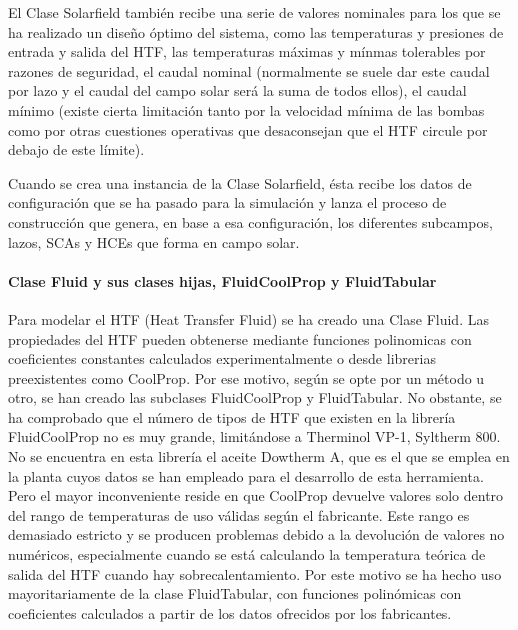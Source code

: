 \documentclass[11pt]{article}
\begin{document}
El Clase Solarfield también recibe una serie de valores nominales para
los que se ha realizado un diseño óptimo del sistema, como las
temperaturas y presiones de entrada y salida del HTF, las temperaturas
máximas y mínmas tolerables por razones de seguridad, el caudal nominal
(normalmente se suele dar este caudal por lazo y el caudal del campo
solar será la suma de todos ellos), el caudal mínimo (existe cierta
limitación tanto por la velocidad mínima de las bombas como por otras
cuestiones operativas que desaconsejan que el HTF circule por debajo de
este límite).

Cuando se crea una instancia de la Clase Solarfield, ésta recibe los
datos de configuración que se ha pasado para la simulación y lanza el
proceso de construcción que genera, en base a esa configuración, los
diferentes subcampos, lazos, SCAs y HCEs que forma en campo solar.

\hypertarget{clase-fluid-y-sus-clases-hijas-fluidcoolprop-y-fluidtabular}{%
\paragraph{Clase Fluid y sus clases hijas, FluidCoolProp y
FluidTabular}\label{clase-fluid-y-sus-clases-hijas-fluidcoolprop-y-fluidtabular}}

Para modelar el HTF (Heat Transfer Fluid) se ha creado una Clase Fluid.
Las propiedades del HTF pueden obtenerse mediante funciones polinomicas
con coeficientes constantes calculados experimentalmente o desde
librerias preexistentes como CoolProp. Por ese motivo, según se opte por
un método u otro, se han creado las subclases FluidCoolProp y
FluidTabular. No obstante, se ha comprobado que el número de tipos de
HTF que existen en la librería FluidCoolProp no es muy grande,
limitándose a Therminol VP-1, Syltherm 800. No se encuentra en esta
librería el aceite Dowtherm A, que es el que se emplea en la planta
cuyos datos se han empleado para el desarrollo de esta herramienta. Pero
el mayor inconveniente reside en que CoolProp devuelve valores solo
dentro del rango de temperaturas de uso válidas según el fabricante.
Este rango es demasiado estricto y se producen problemas debido a la
devolución de valores no numéricos, especialmente cuando se está
calculando la temperatura teórica de salida del HTF cuando hay
sobrecalentamiento. Por este motivo se ha hecho uso mayoritariamente de
la clase FluidTabular, con funciones polinómicas con coeficientes
calculados a partir de los datos ofrecidos por los fabricantes.
\end{document}

